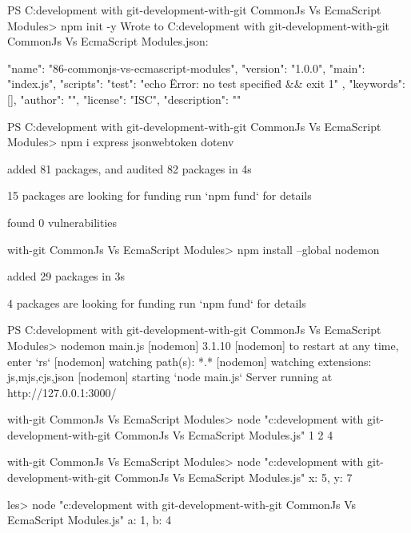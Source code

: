 



PS C:\Users\harsh\Downloads\html development with git\html-development-with-git CommonJs Vs EcmaScript Modules> npm init -y   
Wrote to C:\Users\harsh\Downloads\html development with git\html-development-with-git CommonJs Vs EcmaScript Modules\package.json:

{
  "name": "86-commonjs-vs-ecmascript-modules",
  "version": "1.0.0",
  "main": "index.js",
  "scripts": {
    "test": "echo \"Error: no test specified\" && exit 1"
  },
  "keywords": [],
  "author": "",
  "license": "ISC",
  "description": ""
}




PS C:\Users\harsh\Downloads\html development with git\html-development-with-git CommonJs Vs EcmaScript Modules> npm i express jsonwebtoken dotenv

added 81 packages, and audited 82 packages in 4s

15 packages are looking for funding
  run `npm fund` for details

found 0 vulnerabilities











with-git CommonJs Vs EcmaScript Modules> npm install --global nodemon

added 29 packages in 3s

4 packages are looking for funding
  run `npm fund` for details







  PS C:\Users\harsh\Downloads\html development with git\html-development-with-git CommonJs Vs EcmaScript Modules> nodemon main.js
[nodemon] 3.1.10
[nodemon] to restart at any time, enter `rs`
[nodemon] watching path(s): *.*
[nodemon] watching extensions: js,mjs,cjs,json
[nodemon] starting `node main.js`
Server running at http://127.0.0.1:3000/








with-git CommonJs Vs EcmaScript Modules> node "c:\Users\harsh\Downloads\html development with git\html-development-with-git CommonJs Vs EcmaScript Modules\main.js"
1 2 4



with-git CommonJs Vs EcmaScript Modules> node "c:\Users\harsh\Downloads\html development with git\html-development-with-git CommonJs Vs EcmaScript Modules\main.js"
{ x: 5, y: 7 }



les> node "c:\Users\harsh\Downloads\html development with git\html-development-with-git CommonJs Vs EcmaScript Modules\main.js"
{ a: 1, b: 4 }